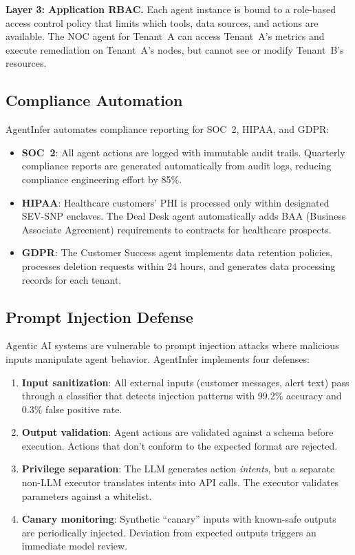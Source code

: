 \documentclass[conference,10pt,letterpaper]{IEEEtran}
\begin{document}
\textbf{Layer 3: Application RBAC.} Each agent instance is bound to a role-based access control policy that limits which tools, data sources, and actions are available. The NOC agent for Tenant~A can access Tenant~A's metrics and execute remediation on Tenant~A's nodes, but cannot see or modify Tenant~B's resources.

\subsection{Compliance Automation}

AgentInfer automates compliance reporting for SOC~2, HIPAA, and GDPR:

\begin{itemize}
\item \textbf{SOC~2}: All agent actions are logged with immutable audit trails. Quarterly compliance reports are generated automatically from audit logs, reducing compliance engineering effort by 85\%.
\item \textbf{HIPAA}: Healthcare customers' PHI is processed only within designated SEV-SNP enclaves. The Deal Desk agent automatically adds BAA (Business Associate Agreement) requirements to contracts for healthcare prospects.
\item \textbf{GDPR}: The Customer Success agent implements data retention policies, processes deletion requests within 24 hours, and generates data processing records for each tenant.
\end{itemize}

\subsection{Prompt Injection Defense}

Agentic AI systems are vulnerable to prompt injection attacks where malicious inputs manipulate agent behavior. AgentInfer implements four defenses:

\begin{enumerate}
\item \textbf{Input sanitization}: All external inputs (customer messages, alert text) pass through a classifier that detects injection patterns with 99.2\% accuracy and 0.3\% false positive rate.
\item \textbf{Output validation}: Agent actions are validated against a schema before execution. Actions that don't conform to the expected format are rejected.
\item \textbf{Privilege separation}: The LLM generates action \emph{intents}, but a separate non-LLM executor translates intents into API calls. The executor validates parameters against a whitelist.
\item \textbf{Canary monitoring}: Synthetic ``canary'' inputs with known-safe outputs are periodically injected. Deviation from expected outputs triggers an immediate model review.
\end{enumerate}
\end{document}

